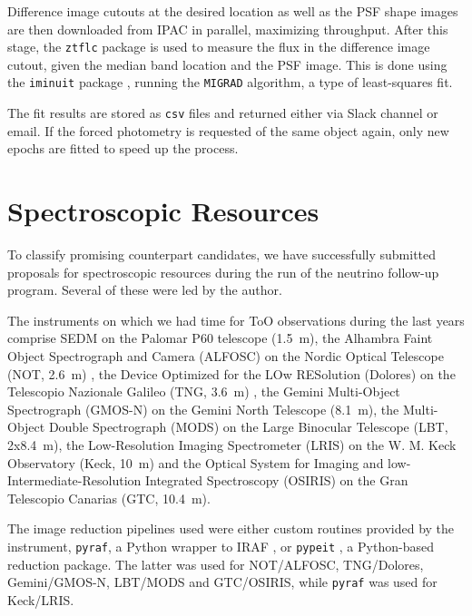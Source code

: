 \documentclass[
    a4paper, %
    fontsize=10pt, %
    twoside=true, %
    numbers=noenddot, %
    fontmethod=tex,
]{kaobook}
\begin{document}
Difference image cutouts at the desired location as well as the PSF shape images are then downloaded from IPAC in parallel, maximizing throughput. After this stage, the \texttt{ztflc} package is used to measure the flux in the difference image cutout, given the median band location and the PSF image. This is done using the \texttt{iminuit} package , running the \texttt{MIGRAD}  algorithm, a type of least-squares fit.

The fit results are stored as \texttt{csv} files and returned either via Slack channel or email. If the forced photometry is requested of the same object again, only new epochs are fitted to speed up the process.

\section{Spectroscopic Resources}
To classify promising counterpart candidates, we have successfully submitted proposals for spectroscopic resources during the run of the neutrino follow-up program. Several of these were led by the author.

The instruments on which we had time for ToO observations during the last years comprise SEDM on the Palomar P60 telescope (\SI{1.5}{\meter}), the Alhambra Faint Object Spectrograph and Camera (ALFOSC) on the Nordic Optical Telescope (NOT, \SI{2.6}{\meter}) , the Device Optimized for the LOw RESolution (Dolores) on the Telescopio Nazionale Galileo (TNG, \SI{3.6}{\meter}) , the Gemini Multi-Object Spectrograph (GMOS-N)  on the Gemini North Telescope (\SI{8.1}{\meter}), the Multi-Object Double Spectrograph (MODS)  on the Large Binocular Telescope (LBT, 2x\SI{8.4}{\meter}), the Low-Resolution Imaging Spectrometer (LRIS)  on the W. M. Keck Observatory (Keck, \SI{10}{\meter}) and the Optical System for Imaging and low-Intermediate-Resolution Integrated Spectroscopy (OSIRIS)  on the Gran Telescopio Canarias (GTC, \SI{10.4}{\meter}).

The image reduction pipelines used were either custom routines provided by the instrument, \texttt{pyraf}, a Python wrapper to IRAF , or \texttt{pypeit} , a Python-based reduction package. The latter was used for NOT/ALFOSC, TNG/Dolores, Gemini/GMOS-N, LBT/MODS and GTC/OSIRIS, while \texttt{pyraf} was used for Keck/LRIS.
\end{document}
